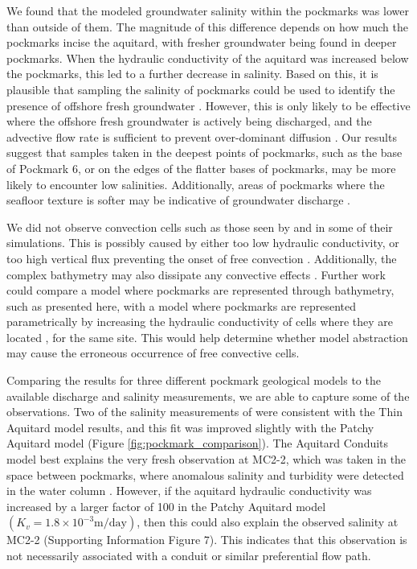 \documentclass[draft, 10pt]{agujournal2019}
\begin{document}
We found that the modeled groundwater salinity within the pockmarks was lower than outside of them.
The magnitude of this difference depends on how much the pockmarks incise the aquitard, with fresher groundwater being found in deeper pockmarks.
When the hydraulic conductivity of the aquitard was increased below the pockmarks, this led to a further decrease in salinity.
Based on this, it is plausible that sampling the salinity of pockmarks could be used to identify the presence of offshore fresh groundwater \cite{hoffmann_fresh_2023, hoffmann_complex_2020}.
However, this is only likely to be effective where the offshore fresh groundwater is actively being discharged, and the advective flow rate is sufficient to prevent over-dominant diffusion \cite{micallef_offshore_2021}.
Our results suggest that samples taken in the deepest points of pockmarks, such as the base of Pockmark 6, or on the edges of the flatter bases of pockmarks,
may be more likely to encounter low salinities. Additionally, areas of pockmarks where the seafloor texture is softer may be indicative of groundwater discharge \cite{harding_characteristics_2000, hoffmann_fresh_2023}.

We did not observe convection cells such as those seen by  and  in some of their simulations.
This is possibly caused by either too low hydraulic conductivity, or too high vertical flux preventing the onset of free convection \cite{greskowiak_tideinduced_2014}.
Additionally, the complex bathymetry may also dissipate any convective effects \cite{simmons_variable-density_2001}.
Further work could compare a model where pockmarks are represented through bathymetry, such as presented here,
with a model where pockmarks are represented parametrically by increasing the hydraulic conductivity of cells where they are located \cite{kaleris_modelling_2002},
for the same site.
This would help determine whether model abstraction may cause the erroneous occurrence of free convective cells.

Comparing the results for three different pockmark geological models to the available discharge and salinity measurements, we are able to capture some of the observations.
Two of the salinity measurements of  were consistent with the Thin Aquitard model results,
and this fit was improved slightly with the Patchy Aquitard model (Figure \ref{fig:pockmark_comparison}).
The Aquitard Conduits model best explains the very fresh observation at MC2-2, which was taken in the space between pockmarks,
where anomalous salinity and turbidity were detected in the water column \cite{hoffmann_fresh_2023}.
However, if the aquitard hydraulic conductivity was increased by a larger factor of 100 in the Patchy Aquitard model $(K_v=1.8\times10^{-3} \mathrm{m/day})$,
then this could also explain the observed salinity at MC2-2  (Supporting Information Figure 7).
This indicates that this observation is not necessarily associated with a conduit or similar preferential flow path.
\end{document}
